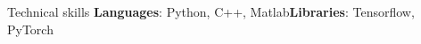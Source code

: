 \documentclass{resume} %
\begin{document}
\begin{rSection}{Technical skills}
 \textbf{Languages}: Python, C++, Matlab\hfill\textbf{Libraries}: Tensorflow, PyTorch 
\end{rSection}
\vspace{-0.1cm}
\end{document}
